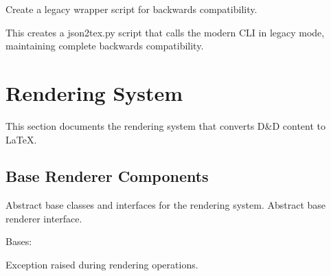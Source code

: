 \documentclass[letterpaper,10pt,english]{sphinxmanual}
\begin{document}

\begin{fulllineitems}
\label{\detokenize{api/cli:src.cli.compat.create_legacy_wrapper}}
\pysigstartsignatures
\pysiglinewithargsret
{}
{}
{}
\pysigstopsignatures
\sphinxAtStartPar
Create a legacy wrapper script for backwards compatibility.

\sphinxAtStartPar
This creates a json2tex.py script that calls the modern CLI
in legacy mode, maintaining complete backwards compatibility.

\end{fulllineitems}


\sphinxstepscope


\section{Rendering System}
\label{\detokenize{api/renderers:rendering-system}}\label{\detokenize{api/renderers::doc}}
\sphinxAtStartPar
This section documents the rendering system that converts D\&D content to LaTeX.


\subsection{Base Renderer Components}
\label{\detokenize{api/renderers:base-renderer-components}}
\sphinxAtStartPar
Abstract base classes and interfaces for the rendering system.
\label{\detokenize{api/renderers:module-src.renderers.base.renderer}}
\sphinxAtStartPar
Abstract base renderer interface.

\begin{fulllineitems}
\label{\detokenize{api/renderers:src.renderers.base.renderer.RenderingError}}
\pysigstartsignatures
\pysigline
{}
\pysigstopsignatures
\sphinxAtStartPar
Bases: 

\sphinxAtStartPar
Exception raised during rendering operations.

\end{fulllineitems}
\end{document}
